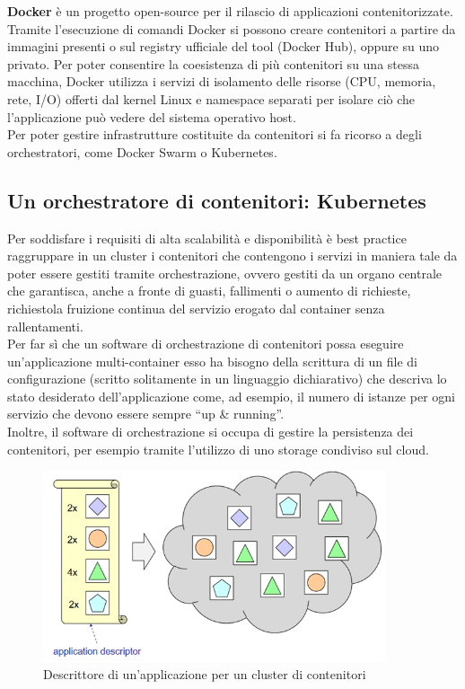 \documentclass[a4paper, 12pt]{report}
\numberwithin{equation}{section}
\begin{document}
\textbf{Docker} è un progetto open-source per il rilascio di applicazioni contenitorizzate. Tramite l’esecuzione di comandi Docker si possono creare contenitori a partire da immagini presenti o sul registry ufficiale del tool (Docker Hub), oppure su uno privato. Per poter consentire la coesistenza di più contenitori su una stessa macchina, Docker utilizza i servizi di isolamento delle risorse (CPU, memoria, rete, I/O) offerti dal kernel Linux e namespace separati per isolare ciò che l’applicazione può vedere del sistema operativo host.\\
Per poter gestire infrastrutture costituite da contenitori si fa ricorso a degli orchestratori, come Docker Swarm o Kubernetes.

\subsection{Un orchestratore di contenitori: Kubernetes}
Per soddisfare i requisiti di alta scalabilità e disponibilità è best practice raggruppare in un cluster i contenitori che contengono i servizi in maniera tale da poter essere gestiti tramite orchestrazione, ovvero gestiti da un organo centrale che garantisca, anche a fronte di guasti, fallimenti o aumento di richieste, richiestola fruizione continua del servizio erogato dal container senza rallentamenti.\\
Per far sì che un software di orchestrazione di contenitori possa eseguire un’applicazione multi-container esso ha bisogno della scrittura di un file di configurazione (scritto solitamente in un linguaggio dichiarativo) che descriva lo stato desiderato dell’applicazione come, ad esempio, il numero di istanze per ogni servizio che devono essere sempre “up & running”.\\
Inoltre, il software di orchestrazione si occupa di gestire la persistenza dei contenitori, per esempio tramite l’utilizzo di uno storage condiviso sul cloud.
\begin{figure}
    \centering
    \includegraphics[width=0.9\textwidth]{imgs/kubernetes.png}
    \caption{Descrittore di un'applicazione per un cluster di contenitori \cite{cabibbo}}
    \label{fig:kubernetes}
\end{figure}
\end{document}
